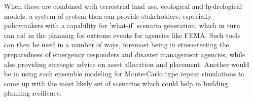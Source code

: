 When these are combined with terrestrial land use, ecological and
hydrological models, a system-of-system then can provide stakeholders,
especially policymakers with a capability for 'what-if' scenario
generation, which in turn can aid in the planning for extreme events
for agencies like FEMA. Such tools can then be used in a number of
ways, foremost being in stress-testing the preparedness of emergency
responders and disaster management agencies, while also providing
strategic advice on asset allocation and placement. Another would be
in using such ensemble modeling for Monte-Carlo type repeat
simulations to come up with the most likely set of scenarios which
could help in building planning resilience. 
